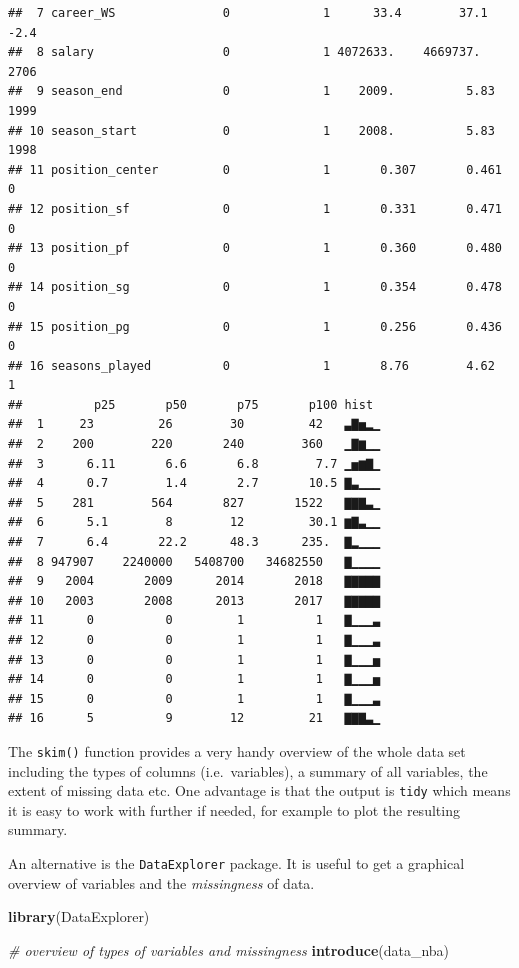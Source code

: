 \documentclass[
]{book}
\newenvironment{Shaded}{\begin{snugshade}}{\end{snugshade}}
\newcommand{\CommentTok}[1]{\textcolor[rgb]{0.56,0.35,0.01}{\textit{#1}}}
\newcommand{\FunctionTok}[1]{\textcolor[rgb]{0.13,0.29,0.53}{\textbf{#1}}}
\newcommand{\NormalTok}[1]{#1}
\begin{document}
\begin{verbatim}
##  7 career_WS               0             1      33.4        37.1     -2.4
##  8 salary                  0             1 4072633.    4669737.    2706  
##  9 season_end              0             1    2009.          5.83  1999  
## 10 season_start            0             1    2008.          5.83  1998  
## 11 position_center         0             1       0.307       0.461    0  
## 12 position_sf             0             1       0.331       0.471    0  
## 13 position_pf             0             1       0.360       0.480    0  
## 14 position_sg             0             1       0.354       0.478    0  
## 15 position_pg             0             1       0.256       0.436    0  
## 16 seasons_played          0             1       8.76        4.62     1  
##          p25       p50       p75       p100 hist 
##  1     23         26        30         42   ▃▇▅▂▁
##  2    200        220       240        360   ▁▇▆▁▁
##  3      6.11       6.6       6.8        7.7 ▁▅▆▇▁
##  4      0.7        1.4       2.7       10.5 ▇▃▁▁▁
##  5    281        564       827       1522   ▇▇▇▃▁
##  6      5.1        8        12         30.1 ▆▇▃▁▁
##  7      6.4       22.2      48.3      235.  ▇▂▁▁▁
##  8 947907    2240000   5408700   34682550   ▇▁▁▁▁
##  9   2004       2009      2014       2018   ▇▇▇▇▇
## 10   2003       2008      2013       2017   ▇▇▇▇▇
## 11      0          0         1          1   ▇▁▁▁▃
## 12      0          0         1          1   ▇▁▁▁▃
## 13      0          0         1          1   ▇▁▁▁▅
## 14      0          0         1          1   ▇▁▁▁▅
## 15      0          0         1          1   ▇▁▁▁▃
## 16      5          9        12         21   ▇▇▇▃▁
\end{verbatim}

The \texttt{skim()} function provides a very handy overview of the whole data set including the types of columns (i.e.~variables), a summary of all variables, the extent of missing data etc. One advantage is that the output is \texttt{tidy} which means it is easy to work with further if needed, for example to plot the resulting summary.

An alternative is the \texttt{DataExplorer} package. It is useful to get a graphical overview of variables and the \emph{missingness} of data.

\begin{Shaded}
\begin{Highlighting}[]
\FunctionTok{library}\NormalTok{(DataExplorer)}

\CommentTok{\# overview of types of variables and missingness}
\FunctionTok{introduce}\NormalTok{(data\_nba)}
\end{Highlighting}
\end{Shaded}
\end{document}
